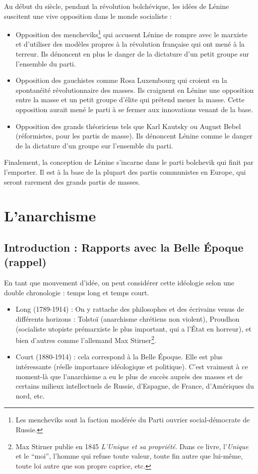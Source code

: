 \documentclass[12pt]{report}
\begin{document}
Au début du siècle, pendant la révolution bolchévique, les idées de Lénine suscitent une vive opposition dans le monde socialiste :
\begin{itemize}
	\item Opposition des mencheviks\footnote{Les mencheviks sont la faction modérée du Parti ouvrier social-démocrate de Russie.} qui accusent Lénine de rompre avec le marxiste et d’utiliser des modèles propres à la révolution française qui ont mené à la terreur. Ils dénoncent en plus le danger de la dictature d'un petit groupe sur l'ensemble du parti.
	\item Opposition des gauchistes comme Rosa Luxembourg qui croient en la spontanéité révolutionnaire des masses. Ils craignent en Lénine une opposition entre la masse et un petit groupe d’élite qui prétend mener la masse. Cette opposition aurait mené le parti à se fermer aux innovations venant de la base.
	\item Opposition des grands théoriciens tels que Karl Kautsky ou August Bebel (réformistes, pour les partis de masse). Ils dénoncent Lénine comme le danger de la dictature d’un groupe sur l’ensemble du parti.
\end{itemize}

Finalement, la conception de Lénine s'incarne dans le parti bolchevik qui finit par l'emporter.
Il est à la base de la plupart des partis communistes en Europe, qui seront rarement des grands partis de masses.

\section{L'anarchisme}

\subsection*{Introduction : Rapports avec la Belle Époque (rappel)}


En tant que mouvement d’idée, on peut considérer cette idéologie selon une double chronologie : temps long et temps court.
\begin{itemize}
	\item Long (1789-1914) : On y rattache des philosophes et des écrivains venus de différents horizons : Tolstoï (anarchisme chrétiens non violent), Proudhon (socialiste utopiste prémarxiste le plus important, qui a l'État en horreur), et bien d’autres comme l'allemand Max Stirner\footnote{Max Stirner publie en 1845 \emph{L'Unique et sa propriété}. Dans ce livre, l'\emph{Unique} et le \enquote{moi}, l'homme qui refuse toute valeur, toute fin autre que lui-même, toute loi autre que son propre caprice, etc.}.
	\item Court (1880-1914) : cela correspond à la Belle Époque. Elle est plus intéressante (réelle importance idéologique et politique). C’est vraiment à ce moment-là que l’anarchisme a eu le plus de succès auprès des masses et de certains milieux intellectuels de Russie, d’Espagne, de France, d’Amériques du nord, etc.
\end{itemize}
\end{document}
